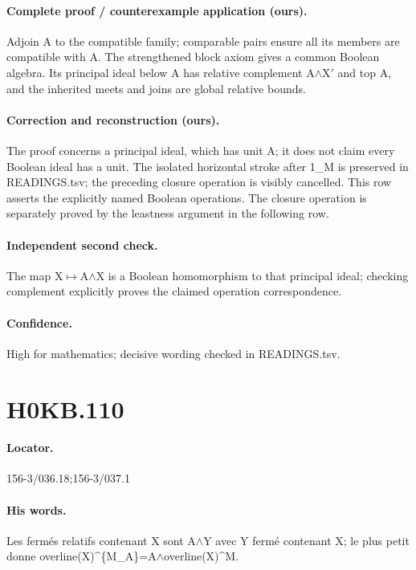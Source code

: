 \paragraph{Complete proof / counterexample application (ours).} Adjoin A to the compatible family; comparable pairs ensure all its members are compatible with A. The strengthened block axiom gives a common Boolean algebra. Its principal ideal below A has relative complement A\ensuremath{\wedge}X\ensuremath{\prime} and top A, and the inherited meets and joins are global relative bounds.

\paragraph{Correction and reconstruction (ours).} The proof concerns a principal ideal, which has unit A; it does not claim every Boolean ideal has a unit. The isolated horizontal stroke after 1\_M is preserved in READINGS.tsv; the preceding closure operation is visibly cancelled. This row asserts the explicitly named Boolean operations. The closure operation is separately proved by the leastness argument in the following row.

\paragraph{Independent second check.} The map X\ensuremath{\mapsto}A\ensuremath{\wedge}X is a Boolean homomorphism to that principal ideal; checking complement explicitly proves the claimed operation correspondence.

\paragraph{Confidence.} High for mathematics; decisive wording checked in READINGS.tsv.

\section*{H0KB.110}\label{statement:H0KB.110}
\paragraph{Locator.} 156-3/036.18;156-3/037.1

\paragraph{His words.} Les fermés relatifs contenant X sont A\ensuremath{\wedge}Y avec Y fermé contenant X; le plus petit donne overline(X)\textasciicircum{}\{M\_A\}=A\ensuremath{\wedge}overline(X)\textasciicircum{}M.

